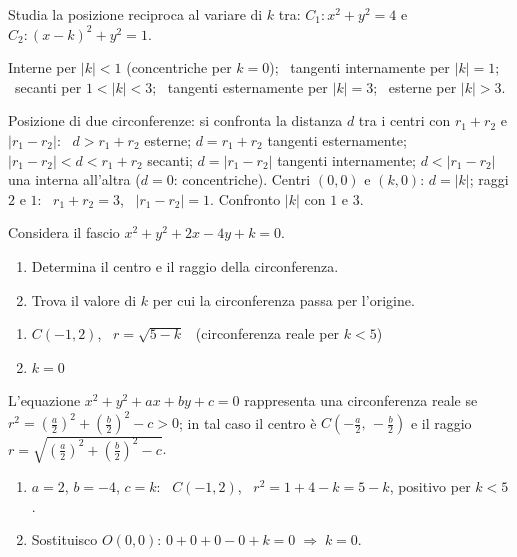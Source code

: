 
\begin{question}[ID=5.5, subtitle={Posizione reciproca di due circonferenze al variare di $k$}, difficulty=media, tags={circonferenze, posizione reciproca, parametrico}]
Studia la posizione reciproca al variare di $k$ tra:
$C_1: x^2+y^2=4$ e $C_2: (x-k)^2+y^2=1$.
\begin{solution}
Interne per $|k|<1$ (concentriche per $k=0$); \ tangenti internamente per $|k|=1$; \ secanti per $1<|k|<3$; \ tangenti esternamente per $|k|=3$; \ esterne per $|k|>3$.
\end{solution}
\begin{explanation}
Posizione di due circonferenze: si confronta la distanza $d$ tra i centri con $r_1+r_2$ e $|r_1-r_2|$: \ $d>r_1+r_2$ esterne; $d=r_1+r_2$ tangenti esternamente; $|r_1-r_2|<d<r_1+r_2$ secanti; $d=|r_1-r_2|$ tangenti internamente; $d<|r_1-r_2|$ una interna all'altra ($d=0$: concentriche).
Centri $(0,0)$ e $(k,0)$: $d=|k|$; raggi $2$ e $1$: \ $r_1+r_2=3$, \ $|r_1-r_2|=1$. Confronto $|k|$ con $1$ e $3$.
\end{explanation}
\end{question}

\begin{question}[ID=6.1, subtitle={Fascio $x^2+y^2+2x-4y+k=0$: centro, raggio e $k$ per l'origine}, difficulty=facile, tags={fasci, circonferenze}]
Considera il fascio $x^2+y^2+2x-4y+k=0$.
\begin{enumerate}
\item Determina il centro e il raggio della circonferenza.
\item Trova il valore di $k$ per cui la circonferenza passa per l'origine.
\end{enumerate}
\begin{solution}
\begin{enumerate}
    \item $C(-1,2)$, \ $r=\sqrt{5-k}$ \ (circonferenza reale per $k<5$)
    \item $k=0$
\end{enumerate}
\end{solution}
\begin{explanation}
L'equazione $x^2+y^2+ax+by+c=0$ rappresenta una circonferenza reale se $r^2=\left(\tfrac a2\right)^2+\left(\tfrac b2\right)^2-c>0$; in tal caso il centro è $C\left(-\tfrac a2,\,-\tfrac b2\right)$ e il raggio $r=\sqrt{\left(\tfrac a2\right)^2+\left(\tfrac b2\right)^2-c}$.
\begin{enumerate}
    \item $a=2$, $b=-4$, $c=k$: \ $C(-1,2)$, \ $r^2=1+4-k=5-k$, positivo per $k<5$.
    \item Sostituisco $O(0,0)$: $0+0+0-0+k=0 \;\Rightarrow\; k=0$.
\end{enumerate}
\end{explanation}
\end{question}

